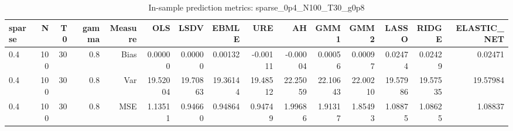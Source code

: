 \begin{table}[!htbp]\centering
\caption{In-sample prediction metrics: sparse_0p4_N100_T30_g0p8}
\label{tab:table2_sparse_0p4_N100_T30_g0p8}
\begin{tabular}{lrrrrrrrrrrrrrr}
\hline
sparse & N & T0 & gamma & Measure & OLS & LSDV & EBMLE & URE & AH & GMM1 & GMM2 & LASSO & RIDGE & ELASTIC_NET \\
\hline
0.4 & 100 & 30 & 0.8 & Bias & 0.00000 & 0.00000 & 0.00132 & -0.00111 & -0.00004 & 0.00056 & 0.00097 & 0.02474 & 0.02429 & 0.02471 \\
0.4 & 100 & 30 & 0.8 & Var & 19.52004 & 19.70863 & 19.36144 & 19.48512 & 22.25059 & 22.10643 & 22.00210 & 19.57986 & 19.57535 & 19.57984 \\
0.4 & 100 & 30 & 0.8 & MSE & 1.13511 & 0.94660 & 0.94864 & 0.94749 & 1.99686 & 1.91317 & 1.85493 & 1.08875 & 1.08625 & 1.08837 \\
\hline
\end{tabular}
\end{table}

